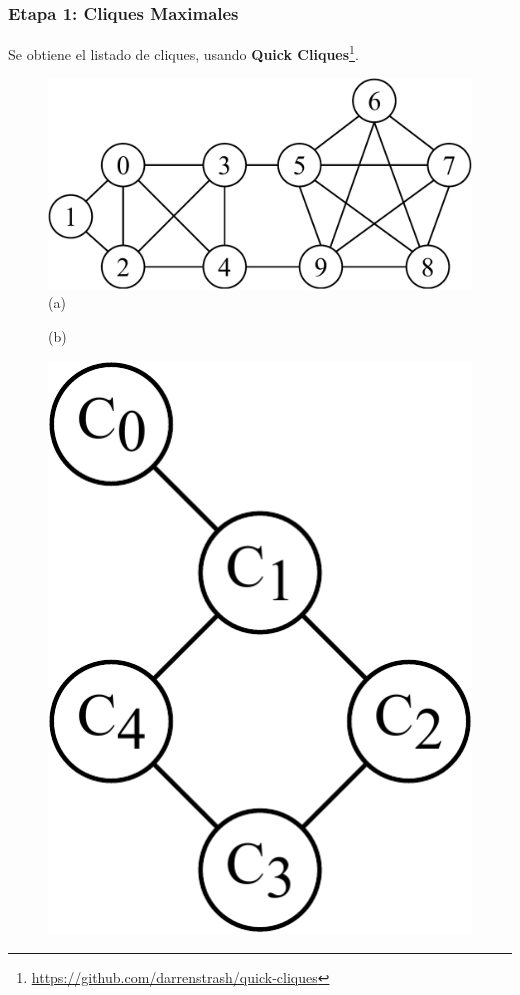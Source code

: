 \begin{frame}
\frametitle{Etapa 1: Cliques Maximales}

Se obtiene el listado de cliques, usando \textbf{Quick Cliques}\footnote{\url{https://github.com/darrenstrash/quick-cliques}}.

\begin{figure}
    	\centering
    	\begin{minipage}{0.45\textwidth}
    		\centering
    		\includegraphics[width=1\linewidth,clip=true]{../img/graphs-Graph2.pdf}
    		(a)
    	\end{minipage}
    	\begin{minipage}{0.25\textwidth}
    		\centering
    		
    		(b)
    	\end{minipage}
    	\begin{minipage}{0.15\textwidth}
    		\centering
    		\includegraphics[width=1\linewidth,clip=true]{../img/graphs-Cliques2.pdf}

\end{minipage}
\end{figure}
\end{frame}
